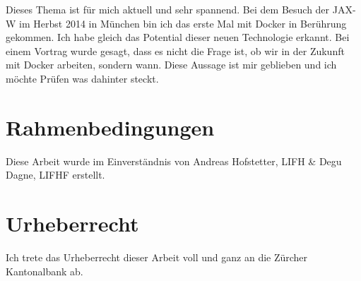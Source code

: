 Dieses Thema ist für mich aktuell und sehr spannend.
Bei dem Besuch der JAX-W im Herbst 2014 in München bin ich das erste Mal mit Docker
in Berührung gekommen. Ich habe gleich das Potential dieser neuen
Technologie erkannt. Bei einem Vortrag wurde gesagt, dass es nicht die
Frage ist, ob wir in der Zukunft mit Docker arbeiten, sondern wann. Diese Aussage
ist mir geblieben und ich möchte Prüfen was dahinter steckt.

\section{Rahmenbedingungen}

Diese Arbeit wurde im Einverständnis von Andreas Hofstetter, LIFH \& Degu Dagne, LIFHF
erstellt.

\section{Urheberrecht}

Ich trete das Urheberrecht dieser Arbeit voll und ganz an die Zürcher Kantonalbank ab.